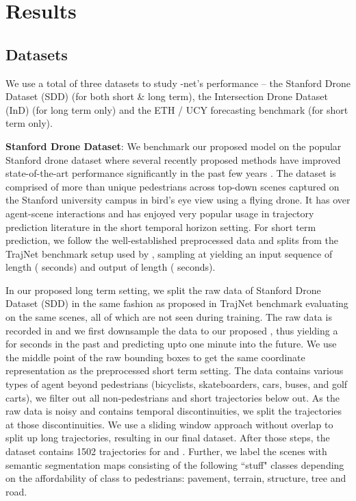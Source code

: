 \documentclass[final]{cvpr}
\begin{document}
\section{Results}
\subsection{Datasets}
We use a total of three datasets to study -net's performance -- the Stanford Drone Dataset (SDD) \cite{robicquet2016learning} (for both short \& long term), the Intersection Drone Dataset (InD) \cite{inDdataset} (for long term only) and the ETH \cite{pellegrini2010improving} / UCY \cite{lerner2007crowds} forecasting benchmark (for short term only).

\noindent \textbf{Stanford Drone Dataset}: We benchmark our proposed model on the popular Stanford drone dataset
\cite{robicquet2016learning} where several recently proposed methods have improved state-of-the-art performance significantly in the past few years \cite{PWCsdd}. The dataset is comprised of more than  unique pedestrians across  top-down scenes captured on the Stanford university campus in bird's eye view using a flying drone. It has over  agent-scene interactions and has enjoyed very popular usage in trajectory prediction literature in the short temporal horizon setting.
For short term prediction, we follow the well-established preprocessed data and splits from the TrajNet benchmark \cite{sadeghian2018trajnet}  setup used by \cite{gupta2018social,sadeghian2019sophie, mangalam2020not, deo2020trajectory}, sampling at  yielding an input sequence of length  ( seconds) and output of length  ( seconds).

In our proposed long term setting, we split the raw data of Stanford Drone Dataset (SDD) in the same fashion as proposed in TrajNet benchmark \cite{sadeghian2018trajnet} evaluating on the same scenes, all of which are not seen during training. The raw data is recorded in  and we first downsample the data to our proposed , thus yielding a  for  seconds in the past and predicting upto one minute into the future. We use the middle point of the raw bounding boxes to get the same coordinate representation as the preprocessed short term setting. The data contains various types of agent beyond pedestrians (bicyclists, skateboarders, cars, buses, and golf carts), we filter out all non-pedestrians and short trajectories below  out. As the raw data is noisy and contains temporal discontinuities, we split the trajectories at those discontinuities. We use a sliding window approach without overlap to split up long trajectories, resulting in our final dataset. After those steps, the dataset contains 1502 trajectories for  and . Further, we label the scenes with semantic segmentation maps consisting of the following  ``stuff" classes \cite{caesar2018coco} depending on the affordability of class to pedestrians: pavement, terrain, structure, tree and road.
\end{document}
